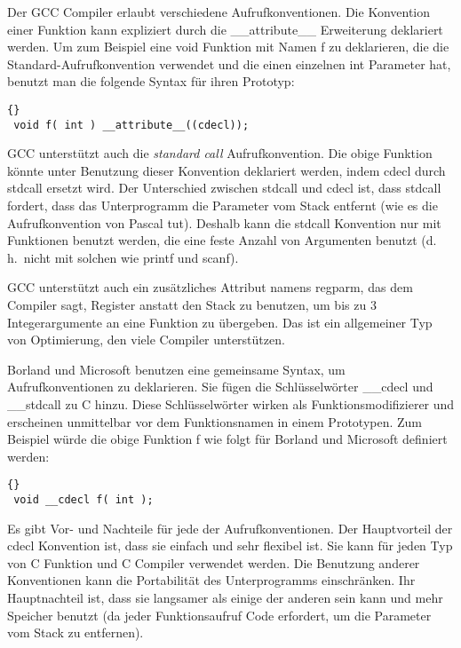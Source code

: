 Der GCC Compiler  erlaubt verschiedene
Aufrufkonventionen. Die Konvention einer Funktion kann expliziert
durch die {\code \_\_attribute\_\_} Erweiterung
 deklariert werden. Um zum
Beispiel eine void Funktion mit Namen {\code f} zu deklarieren, die
die Standard-Aufrufkonvention  verwendet
und die einen einzelnen {\code int} Parameter hat, benutzt man die
folgende Syntax f\"{u}r ihren Prototyp:
\begin{lstlisting}[stepnumber=0]{}
 void f( int ) __attribute__((cdecl));
\end{lstlisting}
GCC unterst\"{u}tzt auch die \emph{standard call}
 Aufrufkonvention. Die obige
Funktion k\"{o}nnte unter Benutzung dieser Konvention deklariert werden,
indem {\code cdecl} durch {\code stdcall} ersetzt wird. Der
Unterschied zwischen {\code stdcall} und {\code cdecl} ist, dass
{\code stdcall} fordert, dass das Unterprogramm die Parameter vom
Stack entfernt (wie es die Aufrufkonvention von Pascal tut). Deshalb
kann die {\code stdcall} Konvention nur mit Funktionen benutzt
werden, die eine feste Anzahl von Argumenten benutzt (d.\,h.\ nicht
mit solchen wie {\code printf}  und {\code scanf}).

GCC unterst\"{u}tzt auch ein zus\"{a}tzliches Attribut namens {\code
regparm},  das dem Compiler sagt,
Register anstatt den Stack zu benutzen, um bis zu 3 Integerargumente
an eine Funktion zu \"{u}bergeben. Das ist ein allgemeiner Typ von
Optimierung, den viele Compiler unterst\"{u}tzen.

Borland  und Microsoft
 benutzen eine gemeinsame Syntax, um
Aufrufkonventionen zu deklarieren. Sie f\"{u}gen die Schl\"{u}sselw\"{o}rter
{\code \_\_cdecl}  und {\code
\_\_stdcall}  zu C hinzu. Diese
Schl\"{u}sselw\"{o}rter wirken als Funktionsmodifizierer und erscheinen
unmittelbar vor dem Funktionsnamen in einem Prototypen. Zum Beispiel
w\"{u}rde die obige Funktion {\code f} wie folgt f\"{u}r Borland und
Microsoft definiert werden:
\begin{lstlisting}[stepnumber=0]{}
 void __cdecl f( int );
\end{lstlisting}

Es gibt Vor- und Nachteile f\"{u}r jede der Aufrufkonventionen. Der
Hauptvorteil der {\code cdecl}  Konvention
ist, dass sie einfach und sehr flexibel ist. Sie kann f\"{u}r jeden Typ
von C Funktion und C Compiler verwendet werden. Die Benutzung
anderer Konventionen kann die Portabilit\"{a}t des Unterprogramms
einschr\"{a}nken. Ihr Hauptnachteil ist, dass sie langsamer als einige
der anderen sein kann und mehr Speicher benutzt (da jeder
Funktionsaufruf Code erfordert, um die Parameter vom Stack zu
entfernen).

